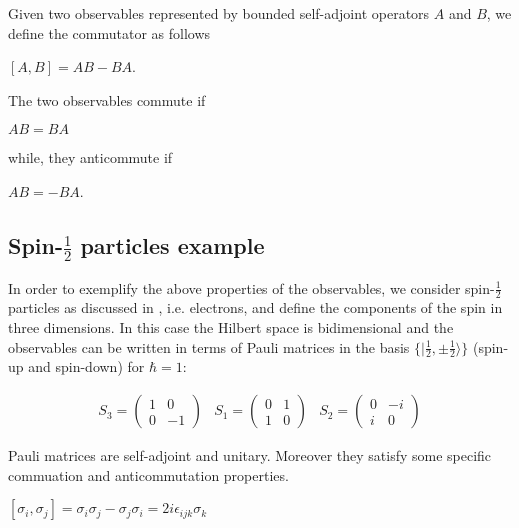 \documentclass{Configuration_Files/PoliMi3i_thesis}
\begin{document}
Given two observables represented by bounded self-adjoint operators $A$ and $B$, we define the commutator as follows

\begin{center}
	$[A, B] = AB - BA$.
\end{center}

The two observables commute if

\begin{center}
	$AB = BA$
\end{center}

while, they anticommute if 

\begin{center}
	$AB = - BA$. 
\end{center}


\subsection{Spin-$\frac{1}{2}$ particles example}

In order to exemplify the above properties of the observables, we consider spin-$\frac{1}{2}$ particles {as discussed in \cite{Cor23}}, i.e. electrons, and define the components of the spin in three dimensions. In this case the Hilbert space is bidimensional and the observables can be written in terms of Pauli matrices in the basis $\{ | \frac{1}{2}, \pm \frac{1}{2} \rangle \}$ (spin-up and spin-down) for $\hbar=1$:


\[
\begin{array}{ccc}
	\text{$S_3$} = 
	\begin{pmatrix}
		1 & 0 \\
		0 & -1
	\end{pmatrix} &
	\text{$S_1$} = 
	\begin{pmatrix}
		0 & 1 \\
		1 & 0
	\end{pmatrix} &
	\text{$S_2$} = 
	\begin{pmatrix}
		0 & -i \\
		i & 0
	\end{pmatrix}
\end{array}
\]

Pauli matrices are self-adjoint and unitary. Moreover they satisfy some specific commuation and anticommutation properties.


\begin{center}
	$[\sigma_i, \sigma_j] = \sigma_i \sigma_j - \sigma_j \sigma_i 
	= 2i\epsilon_{ijk} \sigma_k$
\end{center}
\end{document}
